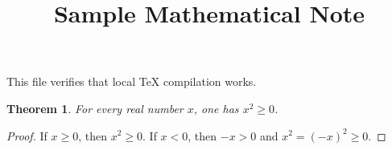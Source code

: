 \documentclass[11pt]{article}
\title{Sample Mathematical Note}
\author{}
\date{}
\newtheorem{theorem}{Theorem}
\begin{document}
\maketitle

This file verifies that local \TeX{} compilation works.

\begin{theorem}
For every real number $x$, one has $x^2\geq 0$.
\end{theorem}

\begin{proof}
If $x\geq 0$, then $x^2\geq 0$. If $x<0$, then $-x>0$ and
$x^2=(-x)^2\geq 0$.
\end{proof}
\end{document}
